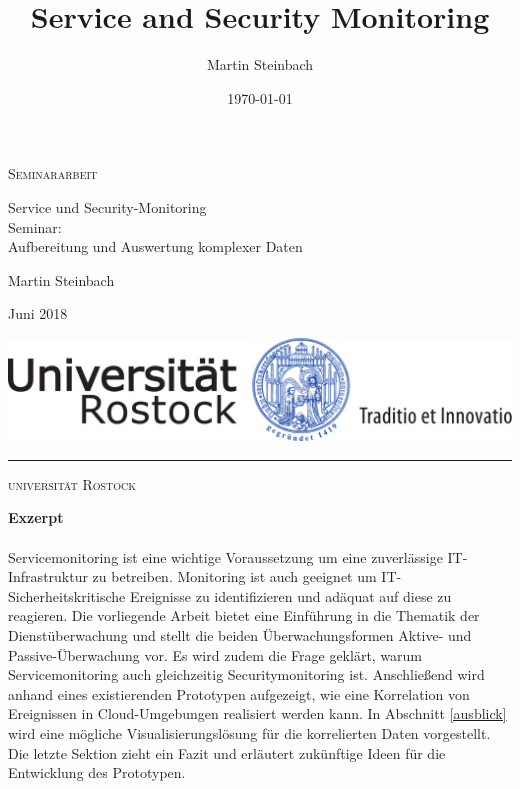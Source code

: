 \documentclass[a4paper,10pt]{scrreprt}
\title{Service and Security Monitoring}
\author{Martin Steinbach}
\date{\today}
\begin{document}
\thispagestyle{empty}
\setcounter{page}{1}
\begin{center}
  
  {\Large \textsc{Seminararbeit}
  
  \vspace{4.25cm}
  
  {\fontsize{22}{22}\selectfont Service und Security-Monitoring\\}
  \vspace{0.75cm}
  {\fontsize{20}{20}\selectfont Seminar:\\\vspace{0.2cm} Aufbereitung und Auswertung 
  komplexer Daten}
}
  
  \vspace{7.25cm}
  
  {\Large Martin Steinbach
    
    \vspace{.15cm}
    
    Juni 2018}
  
  \vspace{1.5cm}
  
  
  \includegraphics[scale=0.5]{img/siegel}
  
  \vspace{0.5cm}
  
  \rule{.7\textwidth}{.40pt}
  
  \vspace{.5cm}
  
  {\large\textsc{universität Rostock}}
    
    \vspace{.15cm}
        
\end{center}
\quad  \addtocounter{page}{-1}
\newpage

\vspace*{\fill}
\textbf{Exzerpt}\\\\
    Servicemonitoring ist eine wichtige Voraussetzung um eine zuverlässige 
    IT-Infrastruktur zu betreiben. Monitoring ist auch geeignet um IT-Sicherheitskritische
    Ereignisse zu identifizieren und adäquat auf diese zu reagieren. Die vorliegende
    Arbeit bietet eine Einführung in die Thematik der Dienstüberwachung und stellt die
    beiden Überwachungsformen Aktive- und Passive-Überwachung vor. Es wird zudem
    die Frage geklärt, warum Servicemonitoring auch gleichzeitig Securitymonitoring ist.
    Anschließend wird anhand eines existierenden Prototypen aufgezeigt, wie eine 
    Korrelation von Ereignissen in Cloud-Umgebungen realisiert werden kann. In Abschnitt 
    \ref{ausblick} wird eine mögliche Visualisierungslösung für die korrelierten Daten 
    vorgestellt. 
    Die letzte Sektion zieht ein Fazit und erläutert zukünftige Ideen für die Entwicklung 
    des Prototypen. 
\vspace*{\fill}
\end{document}
